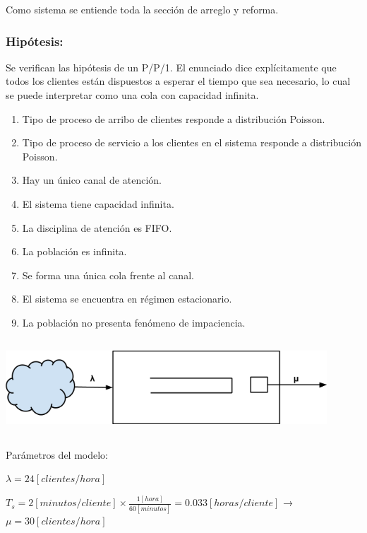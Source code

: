 \documentclass[a4paper,11pt]{article}
\begin{document}
Como sistema se entiende toda la sección de arreglo y
reforma.

\vspace{5pt}
\subsubsection*{Hipótesis:}

Se verifican las hipótesis de un P/P/1. El enunciado dice explícitamente que
todos los clientes están dispuestos a esperar el tiempo que sea necesario, lo
cual se puede interpretar como una cola con capacidad infinita.

\begin{enumerate}[1.]
  \item Tipo de proceso de arribo de clientes responde a distribución Poisson.
  \item Tipo de proceso de servicio a los clientes en el sistema responde a
    distribución Poisson.
  \item Hay un único canal de atención.
  \item El sistema tiene capacidad infinita.
  \item La disciplina de atención es FIFO.
  \item La población es infinita.
  \item Se forma una única cola frente al canal.
  \item El sistema se encuentra en régimen estacionario.
  \item La población no presenta fenómeno de impaciencia.
\end{enumerate}

\vspace{13pt}
\includegraphics[width=341pt, height=101pt, keepaspectratio=true]{TP1-Colas-fig001.png}

\vspace{27pt}
Parámetros del modelo:

$\lambda = 24 [clientes/hora]$

$T_s = 2 [minutos/cliente] \times \frac{1[hora]}{60[minutos]} = 0.033
[horas/cliente]$ → $\mu = 30 [clientes/hora]$
\end{document}
